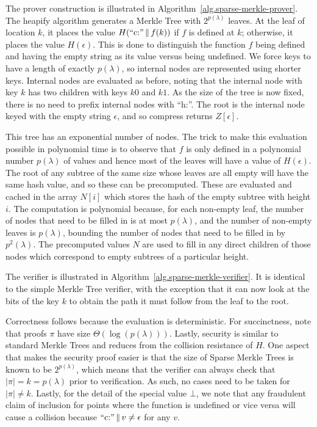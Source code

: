The prover construction is illustrated in
Algorithm~\ref{alg.sparse-merkle-prover}. The \textsf{heapify} algorithm
generates a Merkle Tree with $2^{p(\lambda)}$ leaves. At the leaf of location
$k$, it places the value $H(\text{``c:''} \,\|\, f(k))$ if $f$ is defined at
$k$; otherwise, it places the value $H(\epsilon)$. This is done to distinguish
the function $f$ being defined and having the empty string as its value versus
being undefined. We force keys to have a
length of exactly $p(\lambda)$, so internal nodes are represented using shorter
keys. Internal nodes are
evaluated as before, noting that the internal node with key $k$ has two
children with keys $k0$ and $k1$. As the size of the tree is now fixed, there is
no need to prefix internal nodes with ``h:''. The root is the internal node
keyed with the empty string $\epsilon$, and so \textsf{compress} returns
$Z[\epsilon]$.



This tree has an exponential number of nodes. The trick to make this
evaluation possible in polynomial time is to observe that $f$ is only defined
in a polynomial number $p(\lambda)$ of values and hence most of the leaves will
have a value of $H(\epsilon)$. The root of any subtree of the same size whose
leaves are all empty will have the same hash value, and so these can be
precomputed. These are evaluated and cached in the array $N[i]$ which stores the
hash of the empty subtree with height $i$. The computation is polynomial
because, for each non-empty leaf, the number of nodes that need to be filled in
is at most $p(\lambda)$, and the number of non-empty leaves is $p(\lambda)$,
bounding the number of nodes that need to be filled in by $p^2(\lambda)$. The
precomputed values $N$ are used to fill in any direct children of those nodes
which correspond to empty subtrees of a particular height.



The verifier is illustrated in Algorithm~\ref{alg.sparse-merkle-verifier}. It is
identical to the simple Merkle Tree verifier, with the exception that it can now
look at the bits of the key $k$ to obtain the path it must follow from the leaf
to the root.

Correctness follows because the evaluation is deterministic. For succinctness,
note that proofs $\pi$ have size $\Theta(\log(p(\lambda)))$. Lastly, security
is similar to standard Merkle Trees and reduces from the collision resistance
of $H$. One aspect that makes the security proof easier is that the size of
Sparse Merkle Trees is known to be $2^{p(\lambda)}$, which means that the
verifier can always check that $|\pi| = k = p(\lambda)$ prior to verification.
As such, no cases need to be taken for $|\pi| \neq k$. Lastly, for the detail
of the special value $\bot$, we note that any fraudulent claim of inclusion for
points where the function is undefined or vice versa will cause a collision
because $\text{``c:''} \,\|\, v \neq \epsilon$ for any $v$.

